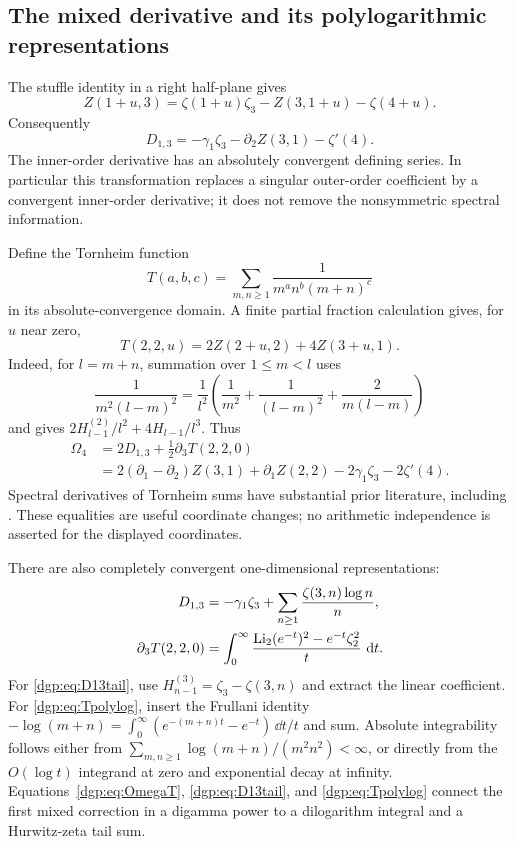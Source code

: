 \subsection{The mixed derivative and its polylogarithmic representations}
\label{dgp:subsec:mixed}

The stuffle identity in a right half-plane gives
\[
 Z(1+u,3)=\zeta(1+u)\zeta_3-Z(3,1+u)-\zeta(4+u).
\]
Consequently
\begin{equation}
 D_{1,3}=-\gamma_1\zeta_3-\partial_2Z(3,1)-\zeta'(4).
 \label{dgp:eq:D13inner}
\end{equation}
The inner-order derivative has an absolutely convergent defining
series.  In particular this transformation replaces a singular
outer-order coefficient by a convergent inner-order derivative; it
does not remove the nonsymmetric spectral information.

Define the Tornheim function
\[
 T(a,b,c)=\sum_{m,n\ge1}\frac1{m^an^b(m+n)^c}
\]
in its absolute-convergence domain.  A finite partial fraction
calculation gives, for $u$ near zero,
\begin{equation}
 T(2,2,u)=2Z(2+u,2)+4Z(3+u,1).
 \label{dgp:eq:T22}
\end{equation}
Indeed, for $l=m+n$, summation over $1\le m<l$ uses
\[
 \frac1{m^2(l-m)^2}
 =\frac1{l^2}\left(\frac1{m^2}+\frac1{(l-m)^2}
                    +\frac2{m(l-m)}\right)
\]
and gives $2H_{l-1}^{(2)}/l^2+4H_{l-1}/l^3$.
Thus
\begin{align}
 \Omega_4
 &=2D_{1,3}+\tfrac12\partial_3T(2,2,0)
 \label{dgp:eq:OmegaT}\\
 &=2(\partial_1-\partial_2)Z(3,1)+\partial_1Z(2,2)
                      -2\gamma_1\zeta_3-2\zeta'(4).
 \label{dgp:eq:OmegaInner}
\end{align}
Spectral derivatives of Tornheim sums have substantial prior literature,
including \cite{tower:BaileyBorwein2016}.  These equalities are useful coordinate changes;
no arithmetic independence is asserted for the displayed coordinates.

There are also completely convergent one-dimensional representations:
\begin{align}
 D_{1,3}
  &=-\gamma_1\zeta_3+
        \sum_{n\ge1}\frac{\zeta(3,n)\log n}{n},
 \label{dgp:eq:D13tail}\\
 \partial_3T(2,2,0)
  &=\int_0^\infty
        \frac{\operatorname{Li}_2(e^{-t})^2-e^{-t}\zeta_2^2}{t}\,\,\mathrm d t.
 \label{dgp:eq:Tpolylog}
\end{align}
For \eqref{dgp:eq:D13tail}, use
$H_{n-1}^{(3)}=\zeta_3-\zeta(3,n)$ and extract the linear
coefficient.  For \eqref{dgp:eq:Tpolylog}, insert the Frullani identity
$-\log(m+n)=\int_0^\infty(e^{-(m+n)t}-e^{-t})\,\dd t/t$
and sum.  Absolute integrability follows either from
$\sum_{m,n\ge1}\log(m+n)/(m^2n^2)<\infty$, or directly from
the $O(\log t)$ integrand at zero and exponential decay at infinity.
Equations~\eqref{dgp:eq:OmegaT}, \eqref{dgp:eq:D13tail}, and
\eqref{dgp:eq:Tpolylog} connect the first mixed correction in a digamma
power to a dilogarithm integral and a Hurwitz-zeta tail sum.

